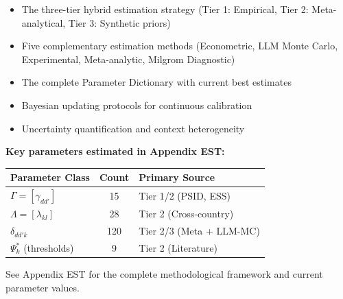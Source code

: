 \begin{itemize}
    \item The three-tier hybrid estimation strategy (Tier 1: Empirical, Tier 2: 
    Meta-analytical, Tier 3: Synthetic priors)
    \item Five complementary estimation methods (Econometric, LLM Monte Carlo, 
    Experimental, Meta-analytic, Milgrom Diagnostic)
    \item The complete Parameter Dictionary with current best estimates
    \item Bayesian updating protocols for continuous calibration
    \item Uncertainty quantification and context heterogeneity
\end{itemize}

\textbf{Key parameters estimated in Appendix EST:}
\begin{center}
\begin{tabular}{lcl}
\toprule
\textbf{Parameter Class} & \textbf{Count} & \textbf{Primary Source} \\
\midrule
$\Gamma = [\gamma_{dd'}]$ & 15 & Tier 1/2 (PSID, ESS) \\
$\Lambda = [\lambda_{kl}]$ & 28 & Tier 2 (Cross-country) \\
$\delta_{dd'k}$ & 120 & Tier 2/3 (Meta + LLM-MC) \\
$\Psi^*_k$ (thresholds) & 9 & Tier 2 (Literature) \\
\bottomrule
\end{tabular}
\end{center}

See Appendix EST for the complete methodological framework and current parameter 
values.






